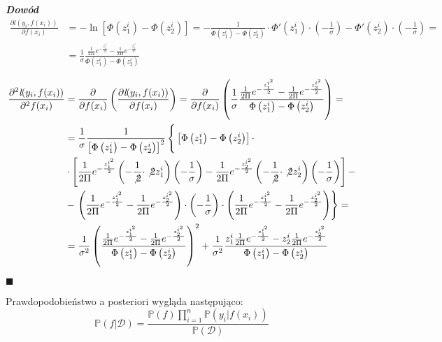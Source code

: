 \documentclass[12pt,a4paper]{article}
\newenvironment{dow}{\textbf{\textit{Dowód}}}{\begin{flushright} $\blacksquare$ \end{flushright}}
\begin{document}
\begin{dow}
\begin{align*}
\frac{\partial\textit{l}(y_i, f(x_i))}{\partial f(x_i)} 
&= -\ln\left[\Phi\left( z_1^i \right) - \Phi\left( z_2^i \right)\right] = -\frac{1}{\Phi\left( z_1^i \right) - \Phi\left( z_2^i \right)}\cdot \Phi'\left( z_1^i \right)\cdot \left( -\frac{1}{\sigma} \right) - \Phi'\left( z_2^i \right)\cdot \left( -\frac{1}{\sigma} \right) = \\
&= \frac{1}{\sigma}\frac{\frac{1}{2\Pi}e^{-\frac{z_1^{i^2}}{2}}-\frac{1}{2\Pi}e^{-\frac{z_2^{i^2}}{2}}}{\Phi\left( z_1^i \right) - \Phi\left( z_2^i \right)}
\end{align*}

\begin{align*}
\frac{\partial^2\textit{l}(y_i, f(x_i))}{\partial^2 f(x_i)} 
&= \frac{\partial}{\partial f(x_i)}\left( \frac{\partial\textit{l}(y_i, f(x_i))}{\partial f(x_i)} \right) = \frac{\partial}{\partial f(x_i)}\left( \frac{1}{\sigma}\frac{\frac{1}{2\Pi}e^{-\frac{z_1^{i^2}}{2}}-\frac{1}{2\Pi}e^{-\frac{z_2^{i^2}}{2}}}{\Phi\left( z_1^i \right) - \Phi\left( z_2^i \right)} \right) =\\
&= \frac{1}{\sigma}\frac{1}{\left[\Phi\left( z_1^i \right) - \Phi\left( z_2^i \right)\right]^2} \left\lbrace  
\vphantom{\left( 
\frac{1}{2\Pi}
e^{-\frac{z_1^{i^2}}{2}}
-
\frac{1}{2\Pi}
e^{-\frac{z_2^{i^2}}{2}} 
\right)
\cdot
\left(
-\frac{1}{\sigma} 
\right) 
\cdot 
\left( 
\frac{1}{2\Pi}e^{-\frac{z_1^{i^2}}{2}}-\frac{1}{2\Pi}e^{-\frac{z_2^{i^2}}{2}} 
\right)}
  \left[\Phi\left( z_1^i \right) - \Phi\left( z_2^i \right)\right]\cdot\right.\\
&\cdot \left[ 
\dfrac{1}{2\Pi}e^{-\frac{z_1^{i^2}}{2}}\left(-\frac{1}{\not{2}}\cdot \not{2}z_1^i\right)\left(-\frac{1}{\sigma} \right) -     
 \dfrac{1}{2\Pi}e^{-\frac{z_2^{i^2}}{2}}\left(-\frac{1}{\not{2}}\cdot \not{2}z_2^i\right)\left(-\frac{1}{\sigma} \right) \right] -\\
&- 
\left. 
\left( 
\frac{1}{2\Pi}
e^{-\frac{z_1^{i^2}}{2}}
-
\frac{1}{2\Pi}
e^{-\frac{z_2^{i^2}}{2}} 
\right)
\cdot
\left(
-\frac{1}{\sigma} 
\right) 
\cdot 
\left( 
\frac{1}{2\Pi}e^{-\frac{z_1^{i^2}}{2}}-\frac{1}{2\Pi}e^{-\frac{z_2^{i^2}}{2}} 
\right)
\right\rbrace =\\
&=\frac{1}{\sigma^2}\left( \frac{\frac{1}{2\Pi}e^{-\frac{z_1^{i^2}}{2}}-\frac{1}{2\Pi}e^{-\frac{z_2^{i^2}}{2}}}{\Phi\left( z_1^i \right) - \Phi\left( z_2^i \right)} \right)^2 + \frac{1}{\sigma^2}\frac{z_1^i\frac{1}{2\Pi}e^{-\frac{z_1^{i^2}}{2}}-z_2^i\frac{1}{2\Pi}e^{-\frac{z_2^{i^2}}{2}}}{\Phi\left( z_1^i \right) - \Phi\left( z_2^i \right)}
\end{align*}

\end{dow}

Prawdopodobieństwo a posteriori wygląda następująco:
$$
\mathbb{P}(f|\mathcal{D}) = \frac{\mathbb{P}(f)\prod_{i=1}^n\mathbb{P}(y_i|f(x_i))}{\mathbb{P}(\mathcal{D})}
$$
\end{document}
